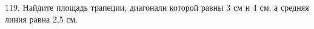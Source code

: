 119. Найдите площадь трапеции, диагонали которой равны 3 см и 4 см, а средняя линия равна 2,5 см.\\
